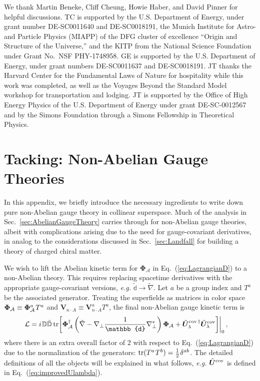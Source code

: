 \documentclass[12pt,document,nofootinbib,superscriptaddress,onecolumn,preprintnumbers,balancelastpage]{article}
\newcommand{\s}{\hspace{0.8pt}}
\newcommand{\PP}{\mathbb{d}}
\DeclareRobustCommand{\Sec}[1]{Sec.~\ref{#1}}
\DeclareRobustCommand{\Eq}[1]{Eq.~(\ref{#1})}
\newcommand{\tr}{\text{tr}}
\newcommand{\bD}{ \boldsymbol{V}_{n \cdot A}}
\newcommand{\bPhialc}{ \boldsymbol{\Phi}_\alc}
\newcommand{\bU}{ \tilde{\boldsymbol U}}
\newcommand{\D}{\mathbb{D}}
\newcommand{\alc}{\mathcal{A}}
\begin{document}
\begin{spacing}{1.2}
\acknowledgments

We thank Martin Beneke, Cliff Cheung, Howie Haber, and David Pinner for helpful discussions.
%
TC is supported by the U.S. Department of Energy, under grant number DE-SC0011640 and DE-SC0018191, the Munich Institute for Astro- and Particle Physics (MIAPP) of the DFG cluster of excellence ``Origin and Structure of the Universe,'' and the KITP from the National Science Foundation under Grant No.\ NSF PHY-1748958.
%
GE is supported by the U.S. Department of Energy, under grant numbers DE-SC0011637 and DE-SC0018191.
%
JT thanks the Harvard Center for the Fundamental Laws of Nature for hospitality while this work was completed, as well as the Voyages Beyond the Standard Model workshop for transportation and lodging.
%
JT is supported by the Office of High Energy Physics of the U.S. Department of Energy under grant DE-SC-0012567 and by the Simons Foundation through a Simons Fellowship in Theoretical Physics.  


\appendix 
\section{Tacking: Non-Abelian Gauge Theories}
\label{sec:nonAbelianGauge}

In this appendix, we briefly introduce the necessary ingredients to write down pure non-Abelian gauge theory in collinear superspace.
%
Much of the analysis in \Sec{sec:AbelianGaugeTheory} carries through for non-Abelian gauge theories, albeit with complications arising due to the need for gauge-covariant derivatives, in analog to the considerations discussed in \Sec{sec:Landfall} for building a theory of charged chiral matter. 

We wish to lift the Abelian kinetic term for $\bPhialc$ in \Eq{eq:LagrangianD} to a non-Abelian theory.
%
This requires replacing spacetime derivatives with the appropriate gauge-covariant versions, \emph{e.g.} $\tilde{\PP} \rightarrow \tilde{\nabla}$.
%
Let $a$ be a group index and $T^a$ be the associated generator.
%
Treating the superfields as matrices in color space $\bPhialc \equiv \bPhialc^a\s T^a$ and $\bD \equiv \bD^a T^a$, the final non-Abelian gauge kinetic term is
%
\begin{align}
\label{eq:LagrangianDnonAbelian}
\mathcal{L}  &=i\s \D \bar{\D} \, \tr \bigg[  \bPhialc^\dagger \left(\tilde{\nabla} - \nabla_\perp \frac{1}{\PP} \nabla_\perp^* \right) \bPhialc + \bU^{\rm cov  \, \dagger}_\lambda \bU^{\rm cov}_\lambda \bigg] \bigg|_{0}\,,
\end{align}
%
where there is an extra overall factor of $2$ with respect to \Eq{eq:LagrangianD} due to the normalization of the generators: $\tr(T^a\s T^b) = \frac{1}{2}\s \delta^{ab}$.
%
The detailed definitions of all the objects will be explained in what follows, \emph{e.g.} $\bU^{\rm cov}$ is defined in \Eq{eq:improvedUlambda}.




\end{spacing}
\end{document}
